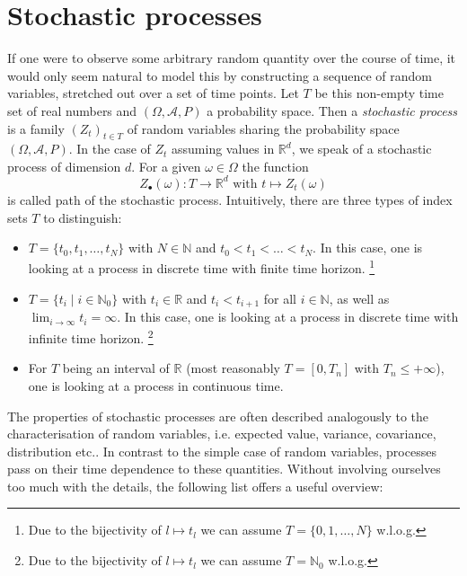\documentclass[12pt]{article}
\begin{document}
\section{Stochastic processes}
If one were to observe some arbitrary random quantity over the course of time, it would only seem natural to model this by constructing a sequence of random variables, stretched out over a set of time \glqq points\grqq . Let $T$ be this non-empty time set of real numbers and $(\Omega, \mathscr{A}, P)$ a probability space. Then a \textit{stochastic process} is a family $(Z_t)_{t \in T}$ of random variables sharing the probability space $(\Omega , \mathscr{A} , P)$. In the case of $Z_t$ assuming values in $\mathbb{R}^d$, we speak of a stochastic process of dimension $d$. For a given $\omega \in \Omega$ the function 
\[
Z_{\bullet} (\omega ) : T \to \mathbb{R} ^d \text{ with } t \mapsto Z_t (\omega )
\]
is called path of the stochastic process.
Intuitively, there are three types of index sets $T$ to distinguish:
\begin{itemize}
\item{$T=\{ t_0 , t_1, \dots , t_N\}$ with $N \in \mathbb{N}$ and $t_0 < t_1 < \dots < t_N$. In this case, one is looking at a process in discrete time with finite time horizon. \footnote{Due to the bijectivity of $l \mapsto t_l$ we can assume $T = \{ 0, 1, \dots , N\}$ w.l.o.g.}}
\item{$T=\{ t_i \mid i \in \mathbb{N}_0\}$ with $t_i \in \mathbb{R}$ and $t_i < t_{i+1} $ for all $i \in \mathbb{N}$, as well as $\lim_{i \to \infty} t_i = \infty$. In this case, one is looking at a process in discrete time with infinite time horizon. \footnote{Due to the bijectivity of $l \mapsto t_l$ we can assume $T = \mathbb{N}_0$ w.l.o.g.}}
\item{For $T$ being an interval of $\mathbb{R}$ (most reasonably $T= \left[0, T_n\right]$ with $T_n \leq + \infty$), one is looking at a process in continuous time.}
\end{itemize}
The properties of stochastic processes are often described analogously to the characterisation of random variables, i.e. expected value, variance, covariance, distribution etc.. In contrast to the \glqq simple \grqq case of random variables, processes pass on their time dependence to these quantities. Without involving ourselves too much with the details, the following list offers a useful overview:
\end{document}
